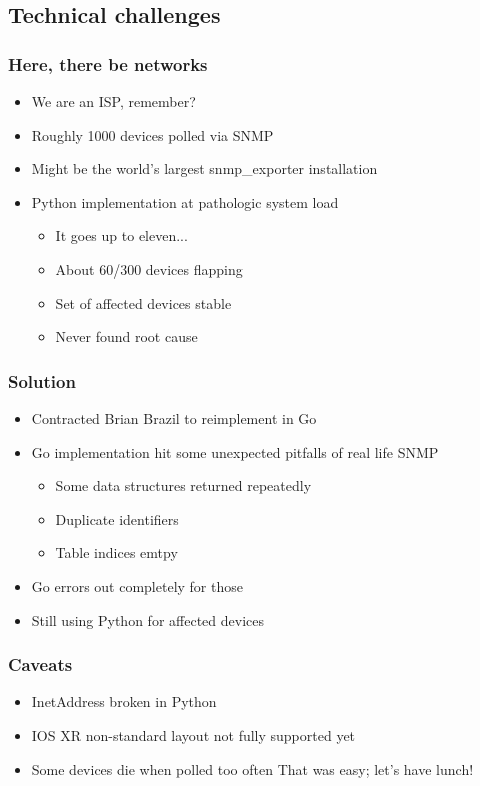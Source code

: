 \documentclass[t]{beamer}
\begin{document}
\subsection{Technical challenges}

\begin{frame}
	\frametitle{Here, there be networks}
	\begin{itemize}
		\item We are an ISP, remember?
		\item Roughly 1000 devices polled via SNMP
		\item Might be the world's largest snmp\_exporter installation
		\item Python implementation at pathologic system load
		\begin{itemize}
			\item It goes up to eleven...
			\item About 60/300 devices flapping
			\item Set of affected devices stable
			\item Never found root cause
		\end{itemize}
	\end{itemize}
\end{frame}

\begin{frame}
	\frametitle{Solution}
	\begin{itemize}
		\item Contracted Brian Brazil to reimplement in Go
		\item Go implementation hit some unexpected pitfalls of real life SNMP
		\begin{itemize}
			\item Some data structures returned repeatedly
			\item Duplicate identifiers
			\item Table indices emtpy
		\end{itemize}
		\item Go errors out completely for those
		\item Still using Python for affected devices
	\end{itemize}
\end{frame}

\begin{frame}
	\frametitle{Caveats}
	\begin{itemize}
		\item InetAddress broken in Python
		\item IOS XR non-standard layout not fully supported yet 
		\item Some devices die when polled too often
		\vfill
			That was easy; let's have lunch!
	\end{itemize}
\end{frame}
\end{document}

